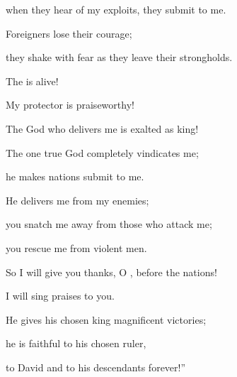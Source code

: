 {\par }{\Q when they hear
of my exploits, they submit
to me.
\par }{\Q {}Foreigners
lose their courage;
\par }{\Q they shake with fear as they leave their strongholds.
\par }{\Q {}The
{}
is alive!

\par }{\Q My protector
is praiseworthy!

\par }{\Q The God
who delivers
me is exalted as king!
\par }{\Q {}The one true God
completely vindicates
me;

\par }{\Q he makes nations
submit
to me.
\par }{\Q {}He delivers
me from my enemies;
\par }{\Q you snatch
me away from those who attack me;

\par }{\Q you rescue
me from violent
men.
\par }{\Q {}So
I will give you thanks,
O
{}, before the nations!

\par }{\Q I will sing praises
to you.
\par }{\Q {}He gives
his chosen king
magnificent
victories;
\par }{\Q he
is faithful
to his chosen ruler,
\par }{\Q to David
and to his descendants
forever!”


}
